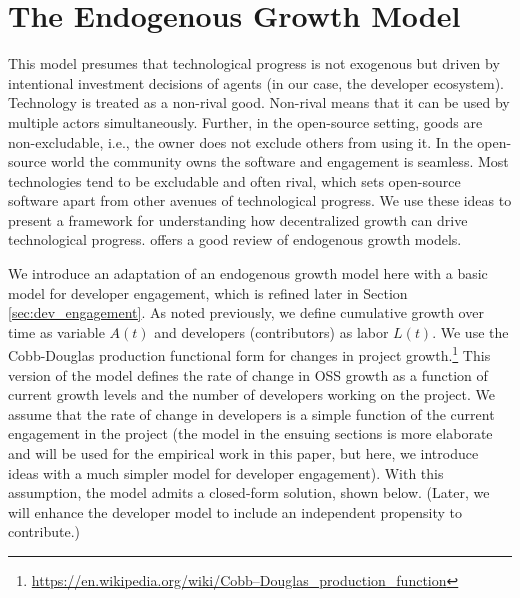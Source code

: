 \documentclass[conference]{IEEEtran}
\begin{document}
\section{The Endogenous Growth Model}
\label{sec:endogenous_growth_model}

This model presumes that technological progress is not exogenous but driven by intentional investment decisions of agents (in our case, the developer ecosystem). Technology is treated as a non-rival good. Non-rival means that it can be used by multiple actors simultaneously. Further, in the open-source setting, goods are non-excludable, i.e., the owner does not exclude others from using it. In the open-source world the community owns the software and engagement is seamless. Most technologies tend to be excludable and often rival, which sets open-source software apart from other avenues of technological progress. We use these ideas to present a framework for understanding how decentralized growth can drive technological progress.  \cite{romer_origins_1994} offers a good review of endogenous growth models.

We introduce an adaptation of an endogenous growth model here with a basic model for developer engagement, which is refined later in Section \ref{sec:dev_engagement}. 
As noted previously, we define cumulative growth over time as variable $A(t)$ and developers (contributors) as labor $L(t)$. We use the Cobb-Douglas production functional form for changes in project growth.\footnote{\url{https://en.wikipedia.org/wiki/Cobb–Douglas_production_function}} This version of the model defines the rate of change in OSS growth as a function of current growth levels and the number of developers working on the project. We assume that the rate of change in developers is a simple function of the current engagement in the project (the model in the ensuing sections is more elaborate and will be used for the empirical work in this paper, but here, we introduce ideas with a much simpler model for developer engagement). With this assumption, the model admits a closed-form solution, shown below. (Later, we will enhance the developer model to include an independent propensity to contribute.)
\end{document}
